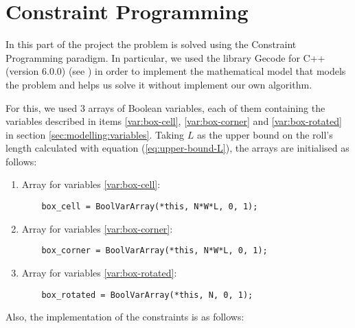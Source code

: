 \section{Constraint Programming}
\label{sec:constraint-programming}

In this part of the project the problem is solved using the Constraint Programming
paradigm. In particular, we used the library Gecode for C++ (version 6.0.0)
(see \cite{GecodeWEB}) in order to implement the mathematical model that models
the problem and helps us solve it without implement our own algorithm.

\hfill

For this, we used 3 arrays of Boolean variables, each of them containing the
variables described in items \ref{var:box-cell}, \ref{var:box-corner} and
\ref{var:box-rotated} in section \ref{sec:modelling:variables}. Taking $L$
as the upper bound on the roll's length calculated with equation
(\ref{eq:upper-bound-L}), the arrays are initialised as follows:

\begin{enumerate}
    \item Array for variables \ref{var:box-cell}:
    
    {\NOINDENT \begin{lstlisting}
    box_cell = BoolVarArray(*this, N*W*L, 0, 1);
    \end{lstlisting}}
    
    \item Array for variables \ref{var:box-corner}:
    
    {\NOINDENT \begin{lstlisting}
    box_corner = BoolVarArray(*this, N*W*L, 0, 1);
    \end{lstlisting}}
    
    \item Array for variables \ref{var:box-rotated}:
    
    {\NOINDENT \begin{lstlisting}
    box_rotated = BoolVarArray(*this, N, 0, 1);
    \end{lstlisting}}
    
\end{enumerate}

Also, the implementation of the constraints is as follows:

